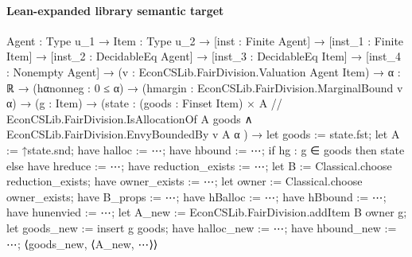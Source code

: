 \documentclass[10pt]{article}
\begin{document}
\paragraph{Lean-expanded library semantic target}
\begin{ReviewVerbatim}
{Agent : Type u_1} →
  {Item : Type u_2} →
    [inst : Finite Agent] →
      [inst_1 : Finite Item] →
        [inst_2 : DecidableEq Agent] →
          [inst_3 : DecidableEq Item] →
            [inst_4 : Nonempty Agent] →
              (v : EconCSLib.FairDivision.Valuation Agent Item) →
                {α : ℝ} →
                  (hαnonneg : 0 ≤ α) →
                    (hmargin : EconCSLib.FairDivision.MarginalBound v α) →
                      (g : Item) →
                        (state :
                            (goods : Finset Item) ×
                              { A //
                                EconCSLib.FairDivision.IsAllocationOf A goods ∧
                                  EconCSLib.FairDivision.EnvyBoundedBy v A α }) →
                          let goods := state.fst;
                          let A := ↑state.snd;
                          have halloc := ⋯;
                          have hbound := ⋯;
                          if hg : g ∈ goods then state
                          else
                            have hreduce := ⋯;
                            have reduction_exists := ⋯;
                            let B := Classical.choose reduction_exists;
                            have owner_exists := ⋯;
                            let owner := Classical.choose owner_exists;
                            have B_props := ⋯;
                            have hBalloc := ⋯;
                            have hBbound := ⋯;
                            have hunenvied := ⋯;
                            let A_new := EconCSLib.FairDivision.addItem B owner g;
                            let goods_new := insert g goods;
                            have halloc_new := ⋯;
                            have hbound_new := ⋯;
                            ⟨goods_new, ⟨A_new, ⋯⟩⟩
\end{ReviewVerbatim}
\end{document}
